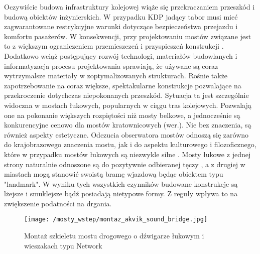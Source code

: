 Oczywiście budowa infrastruktury kolejowej wiąże się przekraczaniem przeszkód i budową obiektów inżynierskich. W przypadku KDP jadący tabor musi mieć zagwarantowane restrykcyjne warunki dotyczące bezpieczeństwa przejazdu i komfortu pasażerów. W konsekwencji, przy projektowaniu mostów związane jest to z większym ograniczeniem przemieszczeń i przyspieszeń konstrukcji \parencite{Niemierko}. Dodatkowo wciąż postępujący rozwój technologi, materiałów budowlanych i informatyzacja procesu projektowania sprawiają, że używane są coraz wytrzymalsze materiały w zoptymalizowanych strukturach. Rośnie także zapotrzebowanie na coraz większe, spektakularne konstrukcje pozwalające na przekroczenie dotychczas niepokonanych przeszkód. Sytuacja ta jest szczególnie widoczna w mostach łukowych, popularnych w ciągu tras kolejowych. Pozwalają one na pokonanie większych rozpiętości niż mosty belkowe, a jednocześnie są konkurencyjne cenowo dla mostów kratownicowych (wer.). Nie bez znaczenia, są również aspekty estetyczne. Odczucia obserwatora mostów odnoszą się zarówno do krajobrazowego znaczenia mostu, jak i do aspektu kulturowego i filozoficznego, które w przypadku mostów łukowych są niezwykle silne \parencite{Kido_Cywiński_2019,Kido_Cywiński_2021}. Mosty łukowe z jednej strony naturalnie odnoszone są do pozytywnie odbieranej tęczy \parencite{Prandowski1994}, a z drugiej w miastach mogą stanowić swoistą bramę wjazdową będąc obiektem typu "landmark". W wyniku tych wszystkich czynników budowane konstrukcje są lżejsze i smuklejsze bądź posiadają nietypowe formy. Z reguły wpływa to na zwiększenie podatności na drgania.

\begin{figure}[hbt!]
	\centering
	\texttt{[image: /mosty\_wstep/montaz\_akvik\_sound\_bridge.jpg]}
	\captionsetup{justification=centering}
	\caption{Montaż szkieletu mostu drogowego o dźwigarze łukowym i wieszakach typu Network}
	\label{fig:bridges_arch_monatage}
\end{figure}

